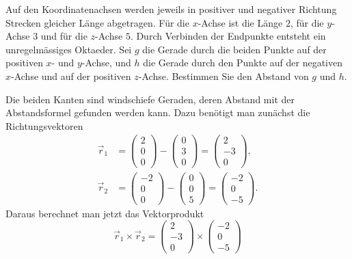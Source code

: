 Auf den Koordinatenachsen werden jeweils in positiver und
negativer Richtung Strecken gleicher Länge abgetragen. Für die
$x$-Achse ist die Länge $2$, für die $y$-Achse $3$ und für die
$z$-Achse $5$. Durch Verbinden der Endpunkte entsteht ein
unregelmässiges Oktaeder. Sei $g$ die
Gerade durch die beiden Punkte auf der positiven $x$- und $y$-Achse,
und $h$ die Gerade durch den Punkte auf der negativen $x$-Achse
und auf der positiven $z$-Achse. Bestimmen Sie den Abstand von $g$ und $h$.


\begin{loesung}
Die beiden Kanten sind windschiefe Geraden, deren Abstand mit
der Abstandsformel gefunden werden kann. Dazu benötigt man zunächst die
Richtungsvektoren
\begin{align*}
\vec r_1&=\begin{pmatrix}2\\0\\0\end{pmatrix}-\begin{pmatrix}0\\3\\0\end{pmatrix}
=
\begin{pmatrix}2\\-3\\0\end{pmatrix}
,\\
\vec r_2&=\begin{pmatrix}-2\\0\\0\end{pmatrix}-\begin{pmatrix}0\\0\\5\end{pmatrix}
=
\begin{pmatrix}-2\\0\\-5\end{pmatrix}
.
\end{align*}
Daraus berechnet man jetzt das Vektorprodukt
\[
\vec r_1\times \vec r_2
=
\begin{pmatrix}2\\-3\\0\end{pmatrix}
\times
\begin{pmatrix}-2\\0\\-5\end{pmatrix}
\]
\end{loesung}
